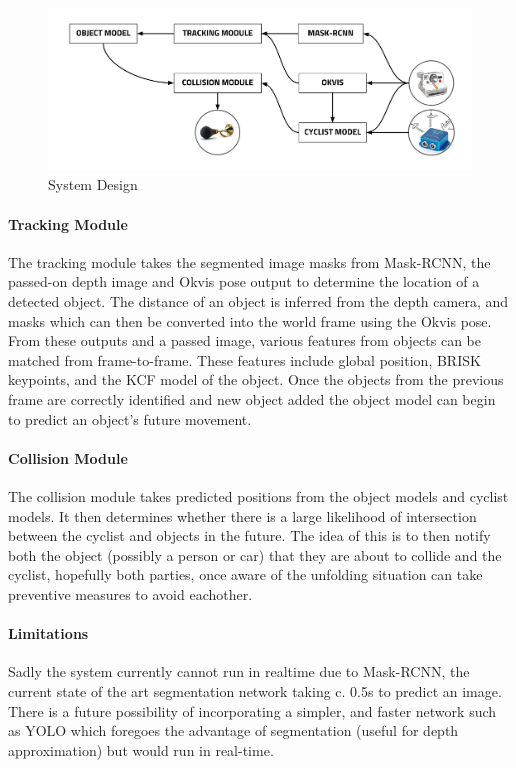 \documentclass[11pt,twoside]{report}
\begin{document}
\noindent \begin{figure}[h!]
	\includegraphics[width = 1.0\hsize]{figures/software_architecture.png}
	\caption{System Design}
	\label{software_soln}
\end{figure}

\paragraph{Tracking Module}

The tracking module takes the segmented image masks from Mask-RCNN, the passed-on depth image and Okvis pose output to determine the location of a detected object. The distance of an object is inferred from the depth camera, and masks which can then be converted into the world frame using the Okvis pose. From these outputs and a passed image, various features from objects can be matched from frame-to-frame. These features include global position, BRISK keypoints, and the KCF model of the object. Once the objects from the previous frame are correctly identified and new object added the object model can begin to predict an object's future movement.

\paragraph{Collision Module}
The collision module takes predicted positions from the object models and cyclist models. It then determines whether there is a large likelihood of intersection between the cyclist and objects in the future. The idea of this is to then notify both the object (possibly a person or car) that they are about to collide and the cyclist, hopefully both parties, once aware of the unfolding situation can take preventive measures to avoid eachother.

\paragraph{Limitations}
Sadly the system currently cannot run in realtime due to Mask-RCNN, the current state of the art segmentation network taking c. 0.5s to predict an image. There is a future possibility of incorporating a simpler, and faster network such as YOLO which foregoes the advantage of segmentation (useful for depth approximation) but would run in real-time.
\end{document}
